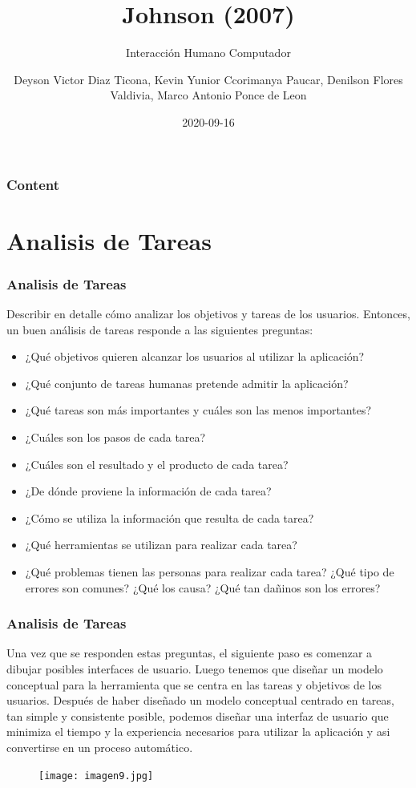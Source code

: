 \documentclass[11pt]{beamer}
\title[Introducción]{\bf\Huge Johnson (2007)}
\subtitle{Interacción Humano Computador}
\author[Grupo 10]
{
    Deyson Victor Diaz Ticona, 
    Kevin Yunior Ccorimanya Paucar, 
    Denilson Flores Valdivia,
    Marco Antonio Ponce de Leon 
}
\institute[UNSA]
{
System Engineering School\\
System Engineering and Informatic Department\\
Production and Services Faculty\\
San Agustin National University of Arequipa
}
\date[2020-09-16]{\scriptsize{2020-09-16}}
\begin{document}
\begin{frame}
\titlepage
\end{frame}

\begin{frame}
\frametitle{Content}
\tableofcontents
\end{frame}

\section{Analisis de Tareas}
\begin{frame}

\frametitle{Analisis de Tareas}
\par
\justify
\color{black}
Describir en detalle cómo analizar los objetivos y tareas de los usuarios. Entonces, un buen análisis de tareas responde a las siguientes preguntas:
\begin{itemize}
    \item ¿Qué objetivos quieren alcanzar los usuarios al utilizar la aplicación?
    \item ¿Qué conjunto de tareas humanas pretende admitir la aplicación?
    \item ¿Qué tareas son más importantes y cuáles son las menos importantes?
    \item ¿Cuáles son los pasos de cada tarea?
    \item ¿Cuáles son el resultado y el producto de cada tarea?
    \item ¿De dónde proviene la información de cada tarea?
    \item ¿Cómo se utiliza la información que resulta de cada tarea?
    \item ¿Qué herramientas se utilizan para realizar cada tarea?
    \item ¿Qué problemas tienen las personas para realizar cada tarea? ¿Qué tipo de errores son comunes? ¿Qué los causa? ¿Qué tan dañinos son los errores?
\end{itemize}
\end{frame}

\begin{frame}
\frametitle{Analisis de Tareas}
    \par
    \justify
    \color{black}
    Una vez que se responden estas preguntas, el siguiente paso es comenzar a dibujar posibles interfaces de usuario. Luego tenemos que diseñar un modelo conceptual para la herramienta que se centra en las tareas y objetivos de los usuarios. Después de haber diseñado un modelo conceptual centrado en tareas, tan simple y consistente posible, podemos diseñar una interfaz de usuario que minimiza el tiempo y la experiencia necesarios para utilizar la aplicación y asi convertirse en un proceso automático.
    \begin{figure}
    \centering
     \texttt{[image: imagen9.jpg]} 
    \end{figure}
\end{frame}
\end{document}
